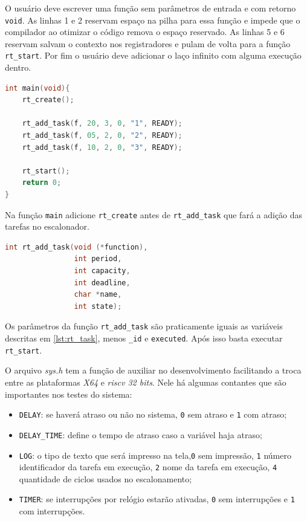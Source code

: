 \documentclass[a4 paper]{article}
\begin{document}
O usuário deve escrever uma função sem parâmetros de entrada e com retorno  \verb|void|. As linhas 1 e 2 reservam espaço na pilha para essa função e impede que o compilador ao otimizar o código remova o espaço reservado. As linhas 5 e 6 reservam salvam o contexto nos registradores e pulam de volta para a função \verb|rt_start|. Por fim o usuário deve adicionar o laço infinito com alguma execução dentro.

\begin{lstlisting}[captionpos=b, language=C, caption=Exemplo de uso]
int main(void){
    rt_create();

    rt_add_task(f, 20, 3, 0, "1", READY);
    rt_add_task(f, 05, 2, 0, "2", READY);
    rt_add_task(f, 10, 2, 0, "3", READY);

    rt_start();
    return 0;
}
\end{lstlisting}

Na função \verb|main| adicione \verb|rt_create| antes de \verb|rt_add_task| que fará a adição das tarefas no escalonador.
\begin{lstlisting}[captionpos=b, language=C, caption=Função de adição das tarefas]
int rt_add_task(void (*function), 
                int period, 
                int capacity, 
                int deadline, 
                char *name,  
                int state);
\end{lstlisting}

Os parâmetros da função \verb|rt_add_task| são praticamente iguais as variáveis descritas em \ref{lst:rt_task}, menos \verb|_id| e \verb|executed|. Após isso basta executar \verb|rt_start|.

O arquivo \textit{sys.h} tem a função de auxiliar no desenvolvimento facilitando a troca entre as plataformas \textit{X64} e \textit{riscv 32 bits}. Nele há algumas contantes que são importantes nos testes do sistema:
\begin{itemize}
    \item \verb|DELAY|: se haverá atraso ou não no sistema,  \verb|0| sem atraso e \verb|1| com atraso;
    \item \verb|DELAY_TIME|: define o tempo de atraso caso a variável haja atraso;
    \item \verb|LOG|: o tipo de texto que será impresso na tela,\verb|0| sem impressão, \verb|1| número identificador da tarefa em execução, \verb|2| nome da tarefa em execução, \verb|4| quantidade de ciclos usados no escalonamento;
    \item \verb|TIMER|: se interrupções por relógio estarão ativadas, \verb|0| sem interrupções e \verb|1| com interrupções.
\end{itemize}
\end{document}
